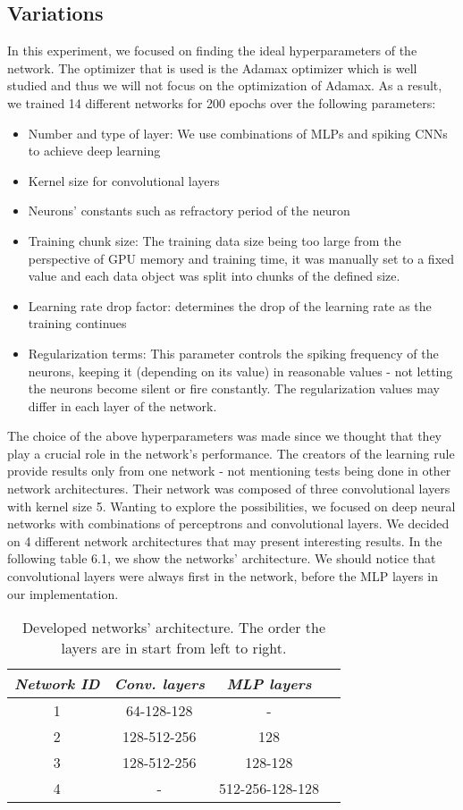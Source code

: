\documentclass[12pt]{report}
\begin{document}
\subsection{Variations}

In this experiment, we focused on finding the ideal hyperparameters of the network. The optimizer that is used is the Adamax optimizer which is well studied and thus we will not focus on the optimization of Adamax. As a result, we trained 14 different networks for 200 epochs over the following parameters:

\begin{itemize}
    \item Number and type of layer: We use combinations of MLPs and spiking CNNs to achieve deep learning
    \item Kernel size for convolutional layers
    \item Neurons' constants such as refractory period of the neuron
    \item Training chunk size: The training data size being too large from the perspective of GPU memory and training time, it was manually set to a fixed value and each data object was split into chunks of the defined size.
    \item Learning rate drop factor: determines the drop of the learning rate as the training continues
    \item Regularization terms: This parameter controls the spiking frequency of the neurons, keeping it (depending on its value) in reasonable values - not letting the neurons become silent or fire constantly. The regularization values may differ in each layer of the network.
\end{itemize}

The choice of the above hyperparameters was made since we thought that they play a crucial role in the network's performance. The creators of the learning rule provide results only from one network - not mentioning tests being done in other network architectures. Their network was composed of three convolutional layers with kernel size 5. Wanting to explore the possibilities, we focused on deep neural networks with combinations of perceptrons and convolutional layers. We decided on 4 different network architectures that may present interesting results. In the following table 6.1, we show the networks' architecture. We should notice that convolutional layers were always first in the network, before the MLP layers in our implementation.

\begin{table}[htbp]
\centering
\begin{tabular}{||c||c|c|c||}
\hline
{\textit{\textbf{Network ID}}} & {\textit{\textbf{Conv. layers}}} & {\textit{\textbf{MLP layers}}} \tabularnewline \hline
1 & 64-128-128 & -\tabularnewline \hline
2 & 128-512-256 & 128\tabularnewline \hline
3 & 128-512-256 & 128-128\tabularnewline \hline
4 & - & 512-256-128-128\tabularnewline \hline
\end{tabular}
\caption{Developed networks' architecture. The order the layers are in start from left to right.}
\label{table:economicSchools2}   
\end{table}
\end{document}
